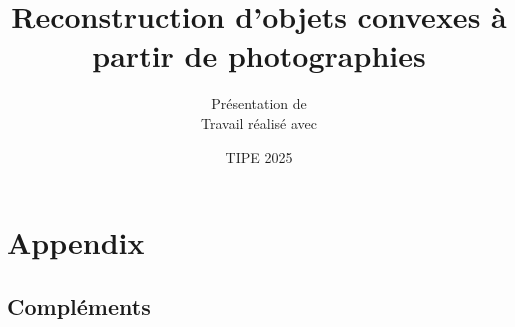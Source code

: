 \documentclass[compress]{beamer}
\title[Reconstruction 3D]{Reconstruction d’objets convexes à partir de photographies}
\author{
  \texorpdfstring{
    \large Présentation de \important{Lucie-Hélène Cuingnet}\\[0.2cm]
    \footnotesize Travail réalisé avec \couleur{Barnabé Baruchel}
    }{Lucie-Hélène Cuingnet et Barnabé Baruchel}
}
\date[Mai 2025]{TIPE 2025}
\begin{document}
\section*{Appendix}
\subsection*{Compléments}


























\end{document}
